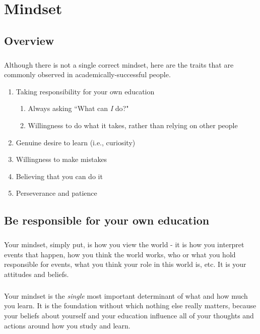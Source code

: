 \chapter{Mindset}
	\section{Overview}
	\paragraph{}
	Although there is not a single correct mindset, here are the traits that are commonly
	observed in academically-successful people. 
	
	\begin{enumerate}
		\item Taking responsibility for your own education
			\begin{enumerate}
			\item Always asking ``What can \emph{I} do?"
			\item Willingness to do what it takes, rather than relying on other people
			\end{enumerate}
		\item Genuine desire to learn (i.e., curiosity)
		\item Willingness to make mistakes
		\item Believing that you can do it 
		\item Perseverance and patience
	\end{enumerate}

	\section{Be responsible for your own education}
	\paragraph{}
	Your mindset, simply put, is how you view the world - it is how you interpret 
	events that happen, how you think the world works, who or what you hold responsible
	for events, what you think your role in this world is, etc. It is your attitudes and 
	beliefs. 
	
	\paragraph{}
	Your mindset is the \emph{single} most important determinant of what and how
	much you learn. It is the foundation without which nothing else really matters, because 
	your beliefs about yourself and your education influence all of your thoughts and actions around
	how you study and learn. 
	
